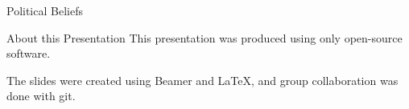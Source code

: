 \documentclass[xcolor=dvipsnames]{beamer}
\begin{document}
\begin{frame}{Political Beliefs}

\end{frame}
\begin{frame}{About this Presentation}
This presentation was produced using only open-source software.

The slides were created using Beamer and LaTeX, and group collaboration was done
with git.
\end{frame}
\end{document}
